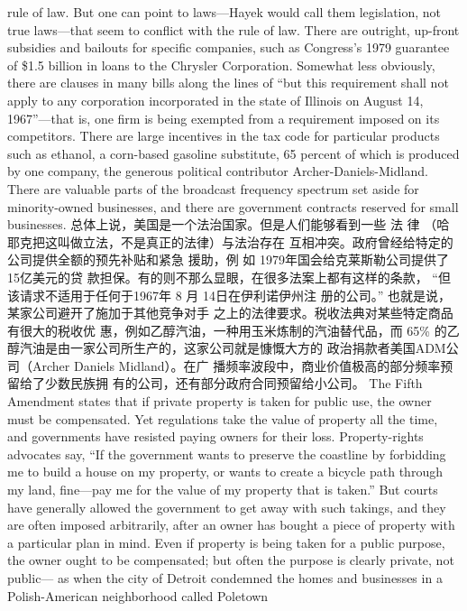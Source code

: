 \begin{paracol}{2}
rule of law. But one can point to laws---Hayek would call them
legislation, not true laws---that seem to conflict with the rule of
law. There are outright, up-front subsidies and bailouts for specific companies, such as Congress's 1979 guarantee of \$1.5 billion in loans to the Chrysler Corporation. Somewhat less
obviously, there are clauses in many bills along the lines of ``but
this requirement shall not apply to any corporation incorporated in the state of Illinois on August 14, 1967''---that is, one
firm is being exempted from a requirement imposed on its
competitors. There are large incentives in the tax code for particular products such as ethanol, a corn-based gasoline substitute, 65 percent of which is produced by one company, the
generous political contributor Archer-Daniels-Midland. There
are valuable parts of the broadcast frequency spectrum set aside
for minority-owned businesses, and there are government contracts reserved for small businesses.
\switchcolumn
总体上说，美国是一个法治国家。但是人们能够看到一些
法 律 （哈耶克把这叫做立法，不是真正的法律）与法治存在
互相冲突。政府曾经给特定的公司提供全额的预先补贴和紧急
援助，例 如 1979年国会给克莱斯勒公司提供了 15亿美元的贷
款担保。有的则不那么显眼，在很多法案上都有这样的条款，
“但该请求不适用于任何于1967年 8 月 14日在伊利诺伊州注
册的公司。” 也就是说，某家公司避开了施加于其他竞争对手
之上的法律要求。税收法典对某些特定商品有很大的税收优
惠，例如乙醇汽油，一种用玉米炼制的汽油替代品，而 65\%
的乙醇汽油是由一家公司所生产的，这家公司就是慷慨大方的
政治捐款者美国ADM公 司（Archer Daniels Midland）。在广
播频率波段中，商业价值极高的部分频率预留给了少数民族拥
有的公司，还有部分政府合同预留给小公司。
\switchcolumn*
The Fifth Amendment states that if private property is taken
for public use, the owner must be compensated. Yet regulations
take the value of property all the time, and governments have
resisted paying owners for their loss. Property-rights advocates
say, ``If the government wants to preserve the coastline by forbidding me to build a house on my property, or wants to create
a bicycle path through my land, fine---pay me for the value of
my property that is taken.'' But courts have generally allowed
the government to get away with such takings, and they are
often imposed arbitrarily, after an owner has bought a piece of
property with a particular plan in mind. Even if property is
being taken for a public purpose, the owner ought to be compensated; but often the purpose is clearly private, not public---
as when the city of Detroit condemned the homes and
businesses in a Polish-American neighborhood called Poletown

\end{paracol}
